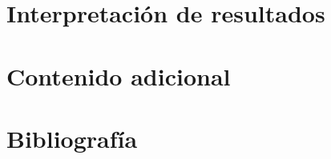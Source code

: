 \documentclass[a4paper, 20pt]{article}
\begin{document}
\section{Interpretación de resultados}

\section{Contenido adicional}
\section{Bibliografía}
\label{ref:XGB}%
\end{document}
